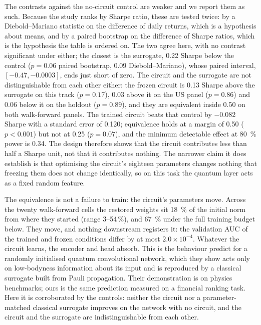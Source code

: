 The contrasts against the no-circuit control are weaker and we report them as
such. Because the study ranks by Sharpe ratio, these are tested twice: by a
Diebold--Mariano statistic on the difference of daily returns, which is a
hypothesis about means, and by a paired bootstrap on the difference of Sharpe
ratios, which is the hypothesis the table is ordered on. The two agree here,
with no contrast significant under either; the closest is the surrogate, \num{0.22}
Sharpe below the control ($p = 0.06$ paired bootstrap, \num{0.09}
Diebold--Mariano), whose paired interval, $[-0.47, -0.0003]$, ends just short of
zero. The circuit and the surrogate are not distinguishable from each other
either: the frozen circuit is \num{0.13} Sharpe above the surrogate on this
track ($p = 0.17$), \num{0.03} above it on the US panel ($p = 0.86$) and
\num{0.06} below it on the holdout ($p = 0.89$), and they are equivalent inside
\num{0.50} on both walk-forward panels. The trained circuit beats that control by \num{-0.082} Sharpe with a
standard error of \num{0.120}; equivalence holds at a margin of \num{0.50}
($p < \num{0.001}$) but not at \num{0.25} ($p = \num{0.07}$), and the minimum
detectable effect at \SI{80}{\percent} power is \num{0.34}. The design
therefore shows that the circuit contributes less than half a Sharpe unit, not
that it contributes nothing. The narrower claim it does establish is that
optimising the circuit's eighteen parameters changes
nothing that freezing them does not change identically, so on this task the
quantum layer acts as a fixed random feature.

The equivalence is not a failure to train: the circuit's parameters move.
Across the twenty walk-forward cells the restored weights sit
\SI{18}{\percent} of the initial norm from where they started (range
\numrange{3}{54}\,\si{\percent}), and \SI{67}{\percent} under the full
training budget below. They move, and nothing downstream registers it: the
validation AUC of the trained and frozen conditions differ by at most
$2.0\times10^{-4}$. Whatever the circuit learns, the encoder and head absorb. This is
the behaviour \citet{bermejo2024quantum} predict for a randomly initialised
quantum convolutional network, which they show acts only on low-bodyness
information about its input and is reproduced by a classical surrogate built
from Pauli propagation. Their demonstration is on physics benchmarks; ours is
the same prediction measured on a financial ranking task. Here it is
corroborated by the controls: neither the circuit nor a parameter-matched
classical surrogate improves on the network with no circuit, and the circuit
and the surrogate are indistinguishable from each other.

